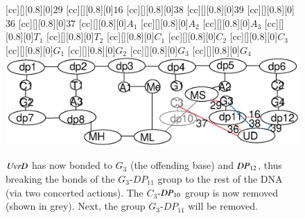 \begin{figure}[t!]
[cc][][0.8][0]{$29$}
[cc][][0.8][0]{$16$}
[cc][][0.8][0]{$38$}
[cc][][0.8][0]{$39$}
[cc][][0.8][0]{$36$}
[cc][][0.8][0]{$37$}
[cc][][0.8][0]{${A_1}$}
[cc][][0.8][0]{${A_2}$}
[cc][][0.8][0]{${A_3}$}
[cc][][0.8][0]{${T_1}$}
[cc][][0.8][0]{${T_2}$}
[cc][][0.8][0]{${C_1}$}
[cc][][0.8][0]{${C_2}$}
[cc][][0.8][0]{\color{gray}${C_3}$}
[cc][][0.8][0]{${G_1}$}
[cc][][0.8][0]{${G_2}$}
[cc][][0.8][0]{${G_3}$}
[cc][][0.8][0]{${G_4}$}
  \centering
    \includegraphics[width=1.0\textwidth]{mmr/state6}
  \caption[A six base pair DNA fragment.]{%
$\mathit{UvrD}$ has now bonded to $G_3$ (the offending base) and $\mathit{DP}_{12}$, thus breaking the bonds of the 
$G_3$-$DP_{11}$ group to the rest of the DNA (via two concerted actions). The $C_3$-$\mathit{DP}_{10}$ group is now removed (shown in grey). Next, the group $G_3$-$DP_{11}$ will be removed.}
  \label{fig:state6}
\end{figure}

